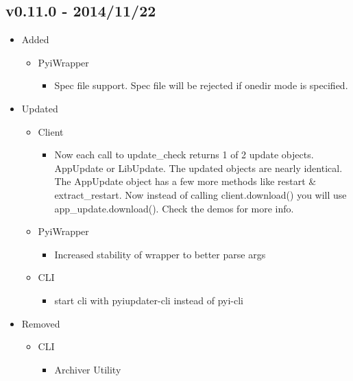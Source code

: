 \documentclass[letterpaper,10pt,english]{sphinxmanual}
\begin{document}
\subsection{v0.11.0 - 2014/11/22}
\label{release_history:v0-11-0-2014-11-22}\begin{itemize}
\item {} 
Added
\begin{itemize}
\item {} 
PyiWrapper
\begin{itemize}
\item {} 
Spec file support. Spec file will be rejected if onedir mode is specified.

\end{itemize}

\end{itemize}

\item {} 
Updated
\begin{itemize}
\item {} 
Client
\begin{itemize}
\item {} 
Now each call to update\_check returns 1 of 2 update objects. AppUpdate or LibUpdate. The updated objects are nearly identical. The AppUpdate object has a few more methods like restart \& extract\_restart. Now instead of calling client.download() you will use app\_update.download(). Check the demos for more info.

\end{itemize}

\item {} 
PyiWrapper
\begin{itemize}
\item {} 
Increased stability of wrapper to better parse args

\end{itemize}

\item {} 
CLI
\begin{itemize}
\item {} 
start cli with pyiupdater-cli instead of pyi-cli

\end{itemize}

\end{itemize}

\item {} 
Removed
\begin{itemize}
\item {} 
CLI
\begin{itemize}
\item {} 
Archiver Utility

\end{itemize}

\end{itemize}

\end{itemize}
\end{document}
